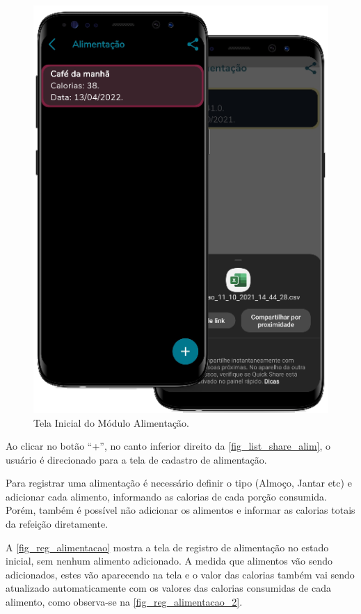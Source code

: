 \begin{figure}[htb]
    \caption{\label{fig_list_share_alim}Tela Inicial do Módulo Alimentação.}
    \begin{center}
        \includegraphics[scale=0.72]{Imagens/desenvolvimento/app/list_share_alim.png}
    \end{center}
\end{figure}

Ao clicar no botão “+”, no canto inferior direito da \autoref{fig_list_share_alim}, o usuário é direcionado
para a tela de cadastro de alimentação.

Para registrar uma alimentação é necessário definir o tipo (Almoço, Jantar etc) e adicionar cada alimento,
informando as calorias de cada porção consumida. Porém, também é possível não adicionar os alimentos
e informar as calorias totais da refeição diretamente.

A \autoref{fig_reg_alimentacao} mostra a tela de registro de alimentação no estado inicial, sem nenhum alimento
adicionado. A medida que alimentos vão sendo adicionados, estes vão aparecendo na tela e o valor das calorias
também vai sendo atualizado automaticamente com os valores das calorias consumidas de cada alimento, como
observa-se na \autoref{fig_reg_alimentacao_2}.

